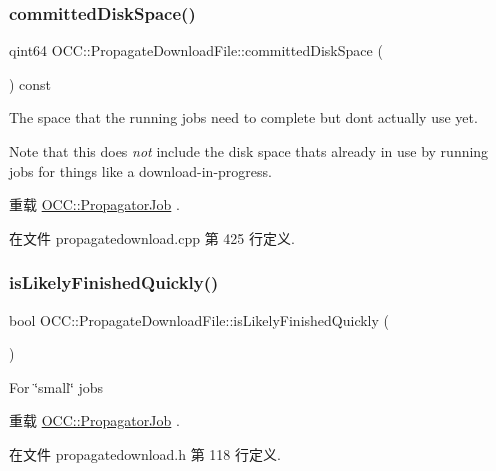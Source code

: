 \subsubsection{\texorpdfstring{committed\+Disk\+Space()}{committedDiskSpace()}}
{\footnotesize\ttfamily qint64 O\+C\+C\+::\+Propagate\+Download\+File\+::committed\+Disk\+Space (\begin{DoxyParamCaption}{ }\end{DoxyParamCaption}) const\hspace{0.3cm}{\ttfamily [virtual]}}

The space that the running jobs need to complete but don\textquotesingle{}t actually use yet.

Note that this does {\itshape not} include the disk space that\textquotesingle{}s already in use by running jobs for things like a download-\/in-\/progress. 

重载 \hyperlink{class_o_c_c_1_1_propagator_job_a7bc39b8adaf93fd29668b768e1e7b20d}{O\+C\+C\+::\+Propagator\+Job} .



在文件 propagatedownload.\+cpp 第 425 行定义.

\mbox{\label{class_o_c_c_1_1_propagate_download_file_a70add8f78720fbedddca87fc139ac737}} 
\subsubsection{\texorpdfstring{is\+Likely\+Finished\+Quickly()}{isLikelyFinishedQuickly()}}
{\footnotesize\ttfamily bool O\+C\+C\+::\+Propagate\+Download\+File\+::is\+Likely\+Finished\+Quickly (\begin{DoxyParamCaption}{ }\end{DoxyParamCaption})\hspace{0.3cm}{\ttfamily [virtual]}}

For \char`\"{}small\char`\"{} jobs 

重载 \hyperlink{class_o_c_c_1_1_propagator_job_a1272ff804d4daf4798f08af6f654944d}{O\+C\+C\+::\+Propagator\+Job} .



在文件 propagatedownload.\+h 第 118 行定义.

